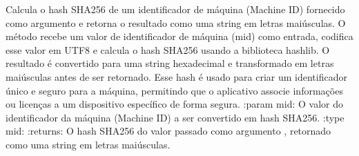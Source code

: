 \documentclass[letterpaper,10pt,english]{sphinxmanual}
\begin{document}
\begin{fulllineitems}
\label{\detokenize{api/simple_lock:simple_lock.machine_id_hash}}
\pysigstartsignatures
\pysiglinewithargsret
{}
{}
{}
\pysigstopsignatures
\sphinxAtStartPar
Calcula o hash SHA\sphinxhyphen{}256 de um identificador de máquina (Machine ID) fornecido como argumento e retorna o resultado como uma string em letras maiúsculas. O método recebe um valor de identificador de máquina (mid) como entrada, codifica esse valor em UTF\sphinxhyphen{}8 e calcula o hash SHA\sphinxhyphen{}256 usando a biblioteca hashlib. O resultado é convertido para uma string hexadecimal e transformado em letras maiúsculas antes de ser retornado. Esse hash é usado para criar um identificador único e seguro para a máquina, permitindo que o aplicativo associe informações ou licenças a um dispositivo específico de forma segura.
:param mid: O valor do identificador da máquina (Machine ID) a ser convertido em hash SHA\sphinxhyphen{}256.
:type mid: 
:returns: O hash SHA\sphinxhyphen{}256 do valor passado como argumento , retornado como uma string em letras maiúsculas.
\begin{quote}\begin{description}
\sphinxAtStartPar
{}

\end{description}\end{quote}

\end{fulllineitems}

\end{document}
